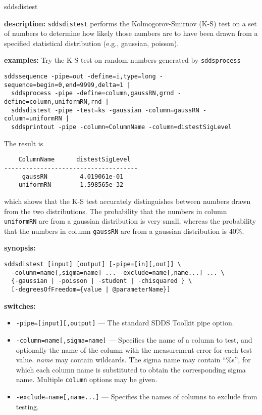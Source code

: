 \begin{sddsprog}{sddsdistest}
  \item \textbf{description:}
    \verb|sddsdistest| performs the Kolmogorov-Smirnov (K-S) test on a set of numbers to determine how likely those numbers are to have been drawn from a specified statistical distribution (e.g., gaussian, poisson).
  \item \textbf{examples:}
    Try the K-S test on random numbers generated by \verb|sddsprocess|
    \begin{verbatim}
sddssequence -pipe=out -define=i,type=long -sequence=begin=0,end=9999,delta=1 |
  sddsprocess -pipe -define=column,gaussRN,grnd -define=column,uniformRN,rnd |
  sddsdistest -pipe -test=ks -gaussian -column=gaussRN -column=uniformRN |
  sddsprintout -pipe -column=ColumnName -column=distestSigLevel
    \end{verbatim}
    The result is
    \begin{verbatim}
    ColumnName      distestSigLevel
-------------------------------------
     gaussRN         4.019061e-01
    uniformRN        1.598565e-32
    \end{verbatim}
    which shows that the K-S test accurately distinguishes between numbers drawn from the two distributions. The probability that the numbers in column \verb|uniformRN| are from a gaussian distribution is very small, whereas the probability that the numbers in column \verb|gaussRN| are from a gaussian distribution is 40\%.
  \item \textbf{synopsis:}
    \begin{verbatim}
sddsdistest [input] [output] [-pipe=[in][,out]] \
  -column=name[,sigma=name] ... -exclude=name[,name...] ... \
  {-gaussian | -poisson | -student | -chisquared } \
  [-degreesOfFreedom={value | @parameterName}]
    \end{verbatim}
  \item \textbf{switches:}
    \begin{itemize}
      \item \verb|-pipe=[input][,output]| --- The standard SDDS Toolkit pipe option.
      \item \verb|-column=name[,sigma=name]| --- Specifies the name of a column to test, and optionally the name of the column with the measurement error for each test value. \emph{name} may contain wildcards. The sigma name may contain ``\%s'', for which each column name is substituted to obtain the corresponding sigma name. Multiple \verb|column| options may be given.
      \item \verb|-exclude=name[,name...]| --- Specifies the names of columns to exclude from testing.

\end{itemize}
\end{sddsprog}

